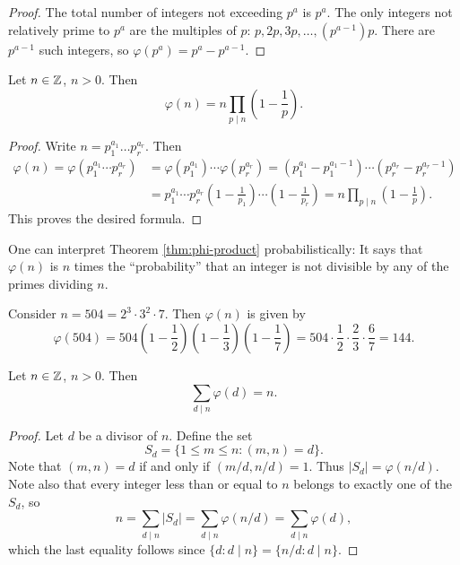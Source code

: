 \begin{proof}
  The total number of integers
  not exceeding $p^a$ is $p^a$. The only
  integers not relatively prime to
  $p^a$ are the multiples of $p$:
  $p, 2p, 3p, \dots, (p^{a - 1}) p$.
  There are $p^{a - 1}$ such integers, so
  $\varphi(p^a) = p^a - p^{a - 1}$.
\end{proof}

\begin{theorem}\label{thm:phi-product}
  Let $n \in \mathbb{Z}$, $n > 0$. Then
  \[
    \varphi(n) = n \prod_{p \mid n} \left(1 - \frac{1}{p}\right).
  \]
\end{theorem}

\begin{proof}
  Write $n = p_1^{a_1} \dots p_r^{a_r}$.
  Then
  \begin{align*}
    \varphi(n)
    = \varphi(p_1^{a_1} \cdots p_r^{a_r})
    &= \varphi(p_1^{a_1}) \cdots \varphi(p_r^{a_r})
    = (p_1^{a_1} - p_1^{a_1 - 1}) \cdots (p_r^{a_r} - p_r^{a_r - 1}) \\
    &= p_1^{a_1} \cdots p_r^{a_r} \left(1 - \frac{1}{p_1}\right) \cdots \left(1 - \frac{1}{p_r}\right)
    = n \prod_{p \mid n} \left(1 - \frac{1}{p}\right).
  \end{align*}
  This proves the desired formula.
\end{proof}

\begin{remark}
  One can interpret
  Theorem \ref{thm:phi-product}
  probabilistically: It says that
  $\varphi(n)$ is $n$ times the ``probability''
  that an integer is not divisible by any
  of the primes dividing $n$.
\end{remark}

\begin{example}
  Consider $n = 504 = 2^3 \cdot 3^2 \cdot 7$.
  Then $\varphi(n)$ is given by
  \[
    \varphi(504)
    = 504 \left(1 - \frac{1}{2}\right)
    \left(1 - \frac{1}{3}\right)
    \left(1 - \frac{1}{7}\right)
    = 504 \cdot \frac{1}{2} \cdot \frac{2}{3} \cdot \frac{6}{7} = 144.
  \]
\end{example}

\begin{theorem}[Gauss]
  Let $n \in \mathbb{Z}$, $n > 0$. Then
  \[
    \sum_{d \mid n} \varphi(d) = n.
  \]
\end{theorem}

\begin{proof}
  Let $d$ be a divisor of $n$. Define
  the set
  \[
    S_d = \{1 \le m \le n : (m, n) = d\}.
  \]
  Note that $(m, n) = d$ if and only if
  $(m / d, n / d) = 1$. Thus
  $|S_d| = \varphi(n / d)$. Note also
  that every integer less than or equal to
  $n$ belongs to exactly one of the
  $S_d$, so
  \[
    n = \sum_{d \mid n} |S_d| = \sum_{d \mid n} \varphi(n / d)
    = \sum_{d \mid n} \varphi(d),
  \]
  which the last equality follows since
  $\{d : d \mid n\} = \{n / d : d \mid n\}$.
\end{proof}

